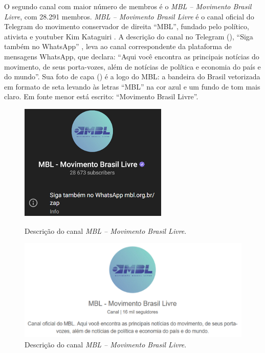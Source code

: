 \documentclass[portuguese]{textolivre}
\begin{document}
O segundo canal com maior número de membros é o \emph{MBL -- Movimento Brasil Livre}, com 28.291 membros. \emph{MBL -- Movimento Brasil Livre} é o canal oficial do Telegram do movimento conservador de direita ``MBL'', fundado pelo político, ativista e youtuber Kim Kataguiri \cite{gazetadopovo2015}. A descrição do canal no Telegram (), ``Siga também no WhatsApp'' , leva ao canal correspondente da plataforma de mensagens WhatsApp, que declara: ``Aqui você encontra as principais notícias do movimento, de seus porta-vozes, além de notícias de política e economia do país e do mundo''. Sua foto de capa () é a logo do MBL: a bandeira do Brasil vetorizada em formato de seta levando às letras ``MBL'' na cor azul e um fundo de tom mais claro. Em fonte menor está escrito: ``Movimento Brasil Livre''.

\begin{figure}[h!]
    \centering
    \begin{minipage}[t]{0.35\textwidth}
        \centering
        \includegraphics[width=\linewidth]{Imagens/Fig3.png}
        \caption{Descrição do canal \emph{MBL -- Movimento Brasil Livre}.}
        \label{fig-3}
    \end{minipage}
    \hfill
    \begin{minipage}[t]{0.6\textwidth}
        \centering
        \includegraphics[width=\linewidth]{Imagens/Fig4.png}
        \caption{Descrição do canal \emph{MBL -- Movimento Brasil Livre}.}
        \label{fig-4}
    \end{minipage}
\end{figure}
\end{document}
